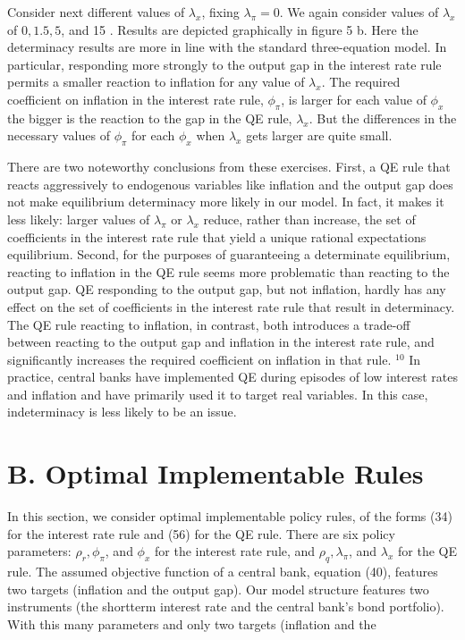 \documentclass[10pt]{article}
\begin{document}
Consider next different values of $\lambda_{x}$, fixing $\lambda_{\pi}=0$. We again consider values of $\lambda_{x}$ of $0,1.5,5$, and 15 . Results are depicted graphically in figure 5 b. Here the determinacy results are more in line with the standard three-equation model. In particular, responding more strongly to the output gap in the interest rate rule permits a smaller reaction to inflation for any value of $\lambda_{x}$. The required coefficient on inflation in the interest rate rule, $\phi_{\pi}$, is larger for each value of $\phi_{x}$ the bigger is the reaction to the gap in the QE rule, $\lambda_{x}$. But the differences in the necessary values of $\phi_{\pi}$ for each $\phi_{x}$ when $\lambda_{x}$ gets larger are quite small.

There are two noteworthy conclusions from these exercises. First, a QE rule that reacts aggressively to endogenous variables like inflation and the output gap does not make equilibrium determinacy more likely in our model. In fact, it makes it less likely: larger values of $\lambda_{\pi}$ or $\lambda_{x}$ reduce, rather than increase, the set of coefficients in the interest rate rule that yield a unique rational expectations equilibrium. Second, for the purposes of guaranteeing a determinate equilibrium,\\
reacting to inflation in the QE rule seems more problematic than reacting to the output gap. QE responding to the output gap, but not inflation, hardly has any effect on the set of coefficients in the interest rate rule that result in determinacy. The QE rule reacting to inflation, in contrast, both introduces a trade-off between reacting to the output gap and inflation in the interest rate rule, and significantly increases the required coefficient on inflation in that rule. ${ }^{10}$ In practice, central banks have implemented QE during episodes of low interest rates and inflation and have primarily used it to target real variables. In this case, indeterminacy is less likely to be an issue.

\section*{B. Optimal Implementable Rules}
In this section, we consider optimal implementable policy rules, of the forms (34) for the interest rate rule and (56) for the QE rule. There are six policy parameters: $\rho_{r}, \phi_{\pi}$, and $\phi_{x}$ for the interest rate rule, and $\rho_{q}, \lambda_{\pi}$, and $\lambda_{x}$ for the QE rule. The assumed objective function of a central bank, equation (40), features two targets (inflation and the output gap). Our model structure features two instruments (the shortterm interest rate and the central bank's bond portfolio). With this many parameters and only two targets (inflation and the
\end{document}

